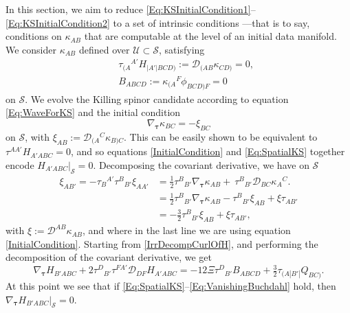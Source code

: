 \documentclass[10pt,a4paper]{article}
\theoremstyle{plain}
\begin{document}
In this section, we aim to reduce
\eqref{Eq:KSInitialCondition1}--\eqref{Eq:KSInitialCondition2} to a
set of intrinsic conditions ---that is to say, conditions on
$\kappa_{AB}$ that are computable at the level of an initial data
manifold. We consider $\kappa_{AB}$ defined over
$\mathcal{U}\subset\mathcal{S}$, satisfying
\begin{subequations}
\begin{eqnarray}
      && \tau_{(A}{}^{A'}H_{\vert A'\vert BCD)} :=
  \mathcal{D}_{(AB}\kappa_{CD)}=0, \label{Eq:SpatialKS}\\ &&
  B_{ABCD}:= \kappa_{(A}{}^F\phi_{BCD)F} =
  0 \label{Eq:VanishingBuchdahl}
\end{eqnarray}
\end{subequations}
on $\mathcal{S}$. We evolve the Killing spinor candidate according to
equation \eqref{Eq:WaveForKS} and the initial condition
\begin{equation}
     \nabla_{\bm\tau} \kappa_{BC} = - \xi_{BC}\label{InitialCondition}
\end{equation}
on $\mathcal{S}$, with
$\xi_{AB}:=\mathcal{D}_{(A}{}^C\kappa_{B)C}$. This can be easily shown
to be equivalent to $\tau^{AA'}H_{A'ABC}=0$, and so equations
\eqref{InitialCondition} and \eqref{Eq:SpatialKS} together encode
$H_{A'ABC}\big\vert_{\mathcal{S}}=0$. Decomposing the covariant
derivative, we have on $\mathcal{S}$
\begin{align}
\xi_{AB'} = - \tau_{B}{}^{A'} \tau^{B}{}_{B'}\xi_{AA'}
&=\tfrac{1}{2}\tau^{B}{}_{B'}\nabla_{\bm\tau}\kappa_{AB} +
\ \tau^{B}{}_{B'}
\mathcal{D}_{BC}\kappa_{A}{}^{C}. \nonumber\\ &=\tfrac{1}{2}\tau^{B}{}_{B'}\nabla_{\bm\tau}\kappa_{AB}
- \tau^B{}_{B'}\xi_{AB} + \xi\tau_{AB'} \nonumber\\ &= -\tfrac{3}{2}
\tau^B{}_{B'}\xi_{AB} +
\xi\tau_{AB'} \label{DecompXiOnSUsingInitialCondition},
\end{align}
with $\xi:=\mathcal{D}^{AB}\kappa_{AB}$, and where in the last line we
are using equation \eqref{InitialCondition}. Starting from
\eqref{IrrDecompCurlOfH}, and performing the decomposition of the
covariant derivative, we get
\[ \nabla_{\bm\tau} H_{B'ABC} + 2 \tau^{D}{}_{B'} \tau^{FA'} \mathcal{D}_{DF}H_{A'ABC} = -12 \Xi \tau^{D}{}_{B'}B_{ABCD} + \tfrac{3}{2} \tau_{(A|B'|}Q_{BC)}.\]
At this point we see that if
\eqref{Eq:SpatialKS}--\eqref{Eq:VanishingBuchdahl} hold, then
$\nabla_{\bm\tau} H_{B'ABC}\big\vert_{\mathcal{S}}=0$.

\medskip
\end{document}

